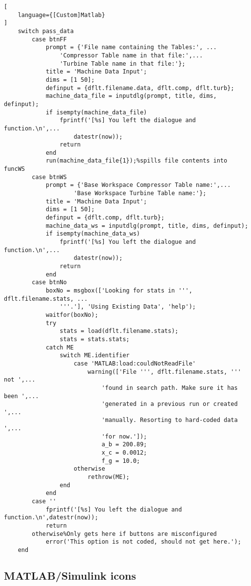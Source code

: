 \begin{lstlisting}[
    language={[Custom]Matlab}
]
    switch pass_data
        case btnFF
            prompt = {'File name containing the Tables:', ...
                'Compressor Table name in that file:',...
                'Turbine Table name in that file:'};
            title = 'Machine Data Input';
            dims = [1 50];
            definput = {dflt.filename.data, dflt.comp, dflt.turb};
            machine_data_file = inputdlg(prompt, title, dims, definput);
            if isempty(machine_data_file)
                fprintf('[%s] You left the dialogue and function.\n',...
                    datestr(now));
                return
            end
            run(machine_data_file{1});%spills file contents into funcWS
        case btnWS
            prompt = {'Base Workspace Compressor Table name:',...
                    'Base Workspace Turbine Table name:'};
            title = 'Machine Data Input';
            dims = [1 50];
            definput = {dflt.comp, dflt.turb};
            machine_data_ws = inputdlg(prompt, title, dims, definput);
            if isempty(machine_data_ws)
                fprintf('[%s] You left the dialogue and function.\n',...
                    datestr(now));
                return
            end
        case btnNo
            boxNo = msgbox(['Looking for stats in ''', dflt.filename.stats, ...
                '''.'], 'Using Existing Data', 'help');
            waitfor(boxNo);
            try
                stats = load(dflt.filename.stats);
                stats = stats.stats;
            catch ME
                switch ME.identifier
                    case 'MATLAB:load:couldNotReadFile'
                        warning(['File ''', dflt.filename.stats, ''' not ',...
                            'found in search path. Make sure it has been ',...
                            'generated in a previous run or created ',...
                            'manually. Resorting to hard-coded data ',...
                            'for now.']);
                            a_b = 200.89;
                            x_c = 0.0012;
                            f_g = 10.0;
                    otherwise
                        rethrow(ME);
                end
            end
        case ''
            fprintf('[%s] You left the dialogue and function.\n',datestr(now));
            return
        otherwise%Only gets here if buttons are misconfigured
            error('This option is not coded, should not get here.');
    end
\end{lstlisting}

\subsection{MATLAB/Simulink icons}

